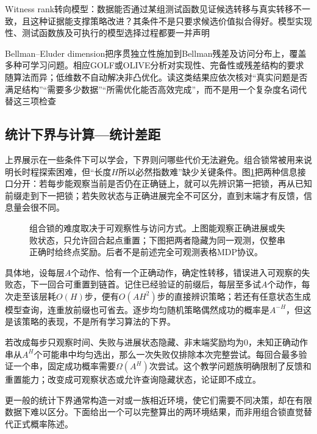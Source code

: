 Witness rank转向模型：数据能否通过某组测试函数见证候选转移与真实转移不一致，且这种证据能支撑策略改进？其条件不是只要求候选价值拟合得好。模型实现性、测试函数族及可执行的模型选择过程都要一并声明

Bellman--Eluder dimension把序贯独立性施加到Bellman残差及访问分布上，覆盖多种可学习问题。相应GOLF或OLIVE分析对实现性、完备性或残差结构的要求随算法而异；低维数不自动解决非凸优化。读这类结果应依次核对“真实问题是否满足结构”“需要多少数据”“所需优化能否高效完成”，而不是用一个复杂度名词代替这三项检查

\subsection{统计下界与计算—统计差距}
\label{sec:rl-learning-statistical-lower}

上界展示在一些条件下可以学会，下界则问哪些代价无法避免。组合锁常被用来说明长时程探索困难，但“长度$H$所以必然指数难”缺少关键条件。图\ref{fig:rl-learning-combination-lock}把两种信息接口分开：若每步能观察当前是否仍在正确链上，就可以先辨识第一把锁，再从已知前缀走到下一把锁；若失败状态与正确进展完全不可区分，直到末端才有反馈，信息量会很不同。

\begin{figure}[t]
  \centering
  
  \caption{组合锁的难度取决于可观察性与访问方式。上图能观察正确进展或失败状态，只允许回合起点重置；下图把两者隐藏为同一观测，仅整串正确时给终点奖励。后者不是前述完全可观测表格MDP协议。}
  \label{fig:rl-learning-combination-lock}
\end{figure}

具体地，设每层$A$个动作、恰有一个正确动作，确定性转移，错误进入可观察的失败态，下一回合可重置到链首。记住已经验证的前缀后，每层至多试$A$个动作，每次走至该层耗$O(H)$步，便有$O(AH^2)$步的直接辨识策略；若还有任意状态生成模型查询，连重放前缀也可省去。逐步均匀随机策略偶然成功的概率是$A^{-H}$，但这是该策略的表现，不是所有学习算法的下界。

若改成每步只观察时间、失败与进展状态隐藏、非末端奖励均为0，未知正确动作串从$A^H$个可能串中均匀选出，那么一次失败仅排除本次完整尝试。每回合最多验证一个串，固定成功概率需要$\Omega(A^H)$次尝试。这个教学问题族明确限制了反馈和重置能力；改变成可观察状态或允许查询隐藏状态，论证即不成立。

更一般的统计下界通常构造一对或一族相近环境，使它们需要不同决策，却在有限数据下难以区分。下面给出一个可以完整算出的两环境结果，而非用组合锁直觉替代正式概率陈述。

